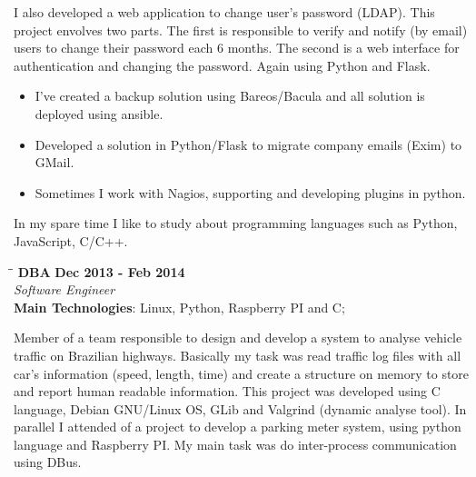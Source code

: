 \documentclass[margin]{res}
\begin{document}
\begin{resume}
I also developed a web application to change user's password (LDAP). This project envolves two parts. The first is responsible to verify and notify (by email) users to change their password each 6 months. The second is a web interface for authentication and changing the password. Again using Python and Flask.

\begin{itemize}
  \item I've created a backup solution using Bareos/Bacula and all solution is deployed using ansible.
  \item Developed a solution in Python/Flask to migrate company emails (Exim) to GMail.
  \item Sometimes I work with Nagios, supporting and developing plugins in python.
\end{itemize}

In my spare time I like to study about programming languages such as Python, JavaScript, C/C++.

\vspace{-0.1in}

\vspace{-0.1in}
   \begin{tabbing}
   \hspace{2.3in}\= \hspace{1.7in}\= \kill %
    \textbf{DBA}    \>\>\textbf{Dec 2013 - Feb 2014}\\
    \textit{Software Engineer}\\        
    \textbf{Main Technologies}: Linux, Python, Raspberry PI and C;
   \end{tabbing}\vspace{-20pt}      %
    \vspace{2mm}
        Member of a team responsible to design and develop a system to analyse vehicle traffic on Brazilian highways. 
        Basically my task was read traffic log files with all car's information (speed, length, time) and create a structure
        on memory to store and report human readable information. This project was developed using C language, Debian GNU/Linux OS, GLib and Valgrind (dynamic analyse tool). 
        In parallel I attended of a project to develop a parking meter system, using python language and Raspberry PI. My main task was do inter-process communication using DBus.
\vspace{-0.1in}


\end{resume}
\end{document}
